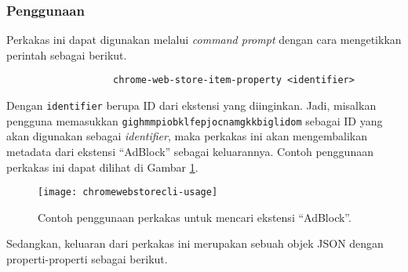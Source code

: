 \subsubsection{Penggunaan}
\label{sec:similarapps-chromewebstore-usage}

Perkakas ini dapat digunakan melalui \textit{command prompt} dengan cara mengetikkan perintah sebagai berikut.

\begin{verbatim}
                   chrome-web-store-item-property <identifier>
\end{verbatim}

Dengan \verb|identifier| berupa ID dari ekstensi yang diinginkan. Jadi, misalkan pengguna memasukkan \verb|gighmmpiobklfepjocnamgkkbiglidom| sebagai ID yang akan digunakan sebagai \textit{identifier}, maka perkakas ini akan mengembalikan metadata dari ekstensi ``AdBlock'' sebagai keluarannya. Contoh penggunaan perkakas ini dapat dilihat di Gambar \ref{fig:similarapps-chromewebstorecli-usage}.

\begin{figure}[ht]
    \centering
    \texttt{[image: chromewebstorecli-usage]}
    \caption[Contoh penggunaan perkakas \chromewebstorecli]{Contoh penggunaan perkakas \chromewebstorecli\xspace untuk mencari ekstensi ``AdBlock''.}
    \label{fig:similarapps-chromewebstorecli-usage}
\end{figure}

Sedangkan, keluaran dari perkakas ini merupakan sebuah objek JSON dengan properti-properti sebagai berikut.

